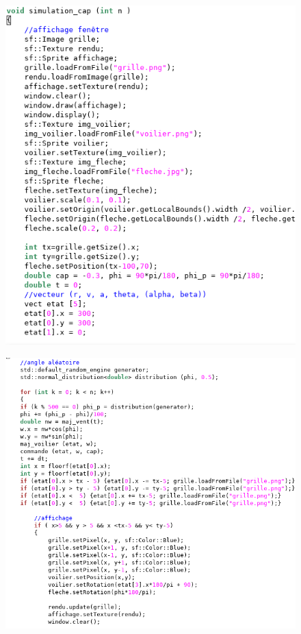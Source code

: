 \documentclass{beamer}
\begin{document}
\begin{frame}[plain]
\begin{figure}
\includegraphics[scale=0.35]{sim5.png} 
\end{figure}
\end{frame}

\begin{frame}[plain]
\begin{figure}
\includegraphics[scale=0.35]{sim6.png} 
\end{figure}
\end{frame}
\end{document}
